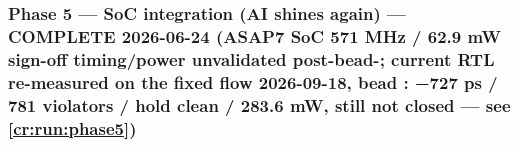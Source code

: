 \subsubsection{\texorpdfstring{Phase 5 --- SoC integration (AI shines
again) --- \ok{} COMPLETE 2026-06-24 (ASAP7 SoC 571 MHz / 62.9 mW
sign-off \warn{} timing/\allowbreak{}power unvalidated
post-bead-; current RTL re-measured on the fixed flow
2026-09-18, bead : −727 ps / 781 violators / hold clean /
283.6 mW, still not closed --- see
\cref{cr:run:phase5})}{Phase 5 --- SoC integration (AI shines again) ---  COMPLETE 2026-06-24 (ASAP7 SoC 571 MHz / 62.9 mW sign-off  timing/power unvalidated post-bead-; current RTL re-measured on the fixed flow 2026-09-18, bead : −727 ps / 781 violators / hold clean / 283.6 mW, still not closed --- see )}}\label{cr:status:roadmap:phase-5-soc-integration-ai-shines-again-white-check-mark-complete-2026-06-24-asap7-soc-571-mhz-629-mw-sign-off-warning-timingpower-unvalidated-post-bead-8f3-current-rtl-re-measured-on-the-fixed-flow-2026-09-18-bead-0d0-727-ps-781-violators-hold-clean-2836-mw-still-not-closed-see-docsphase5-run-historymd}


